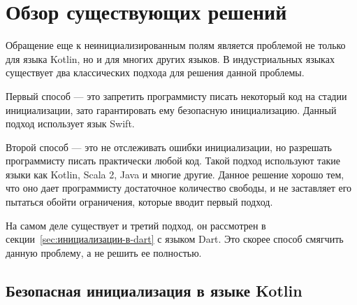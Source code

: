 \chapter{Обзор существующих решений}\label{ch:обзор-существующих-решений}

Обращение еще к неинициализированным полям является проблемой не только для языка Kotlin, но и для многих других языков.
В индустриальных языках существует два классических подхода для решения данной проблемы.

Первый способ --- это запретить программисту писать некоторый код на стадии инициализации,
зато гарантировать ему безопасную инициализацию.
Данный подход использует язык Swift.

Второй способ --- это не отслеживать ошибки инициализации, но разрешать программисту писать практически любой код.
Такой подход используют такие языки как Kotlin, Scala 2, Java и многие другие.
Данное решение хорошо тем, что оно дает программисту достаточное количество свободы,
и не заставляет его пытаться обойти ограничения, которые вводит первый подход.

На самом деле существует и третий подход, он рассмотрен в секции~\ref{sec:инициализации-в-dart} с языком Dart.
Это скорее способ смягчить данную проблему, а не решить ее полностью.

\section{Безопасная инициализация в языке Kotlin}\label{sec:безопасная-инициализация-в-языке-kotlin}


